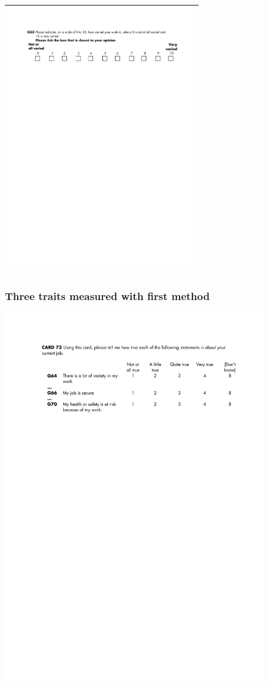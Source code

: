 \documentclass{beamer}
\begin{document}
\begin{frame}
\begin{tabular}{l}
		 \includegraphics[width=8cm]{i/trait-1-m-3.pdf}\\
		\hline
	\end{tabular}
\end{frame}

\begin{frame}
	\frametitle{Three traits measured with first method}
		\includegraphics[width=11.2cm]{i/method-1.pdf}
\end{frame}
\end{document}
